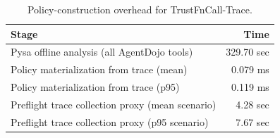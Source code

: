 \begin{table}[t]
\centering
\caption{Policy-construction overhead for TrustFnCall-Trace.}
\label{tab:system-policy}
\small
\begin{tabular}{lr}
\toprule
\textbf{Stage} & \textbf{Time} \\
\midrule
Pysa offline analysis (all AgentDojo tools) & 329.70 sec \\
Policy materialization from trace (mean) & 0.079 ms \\
Policy materialization from trace (p95) & 0.119 ms \\
Preflight trace collection proxy (mean scenario) & 4.28 sec \\
Preflight trace collection proxy (p95 scenario) & 7.67 sec \\
\bottomrule
\end{tabular}
\end{table}